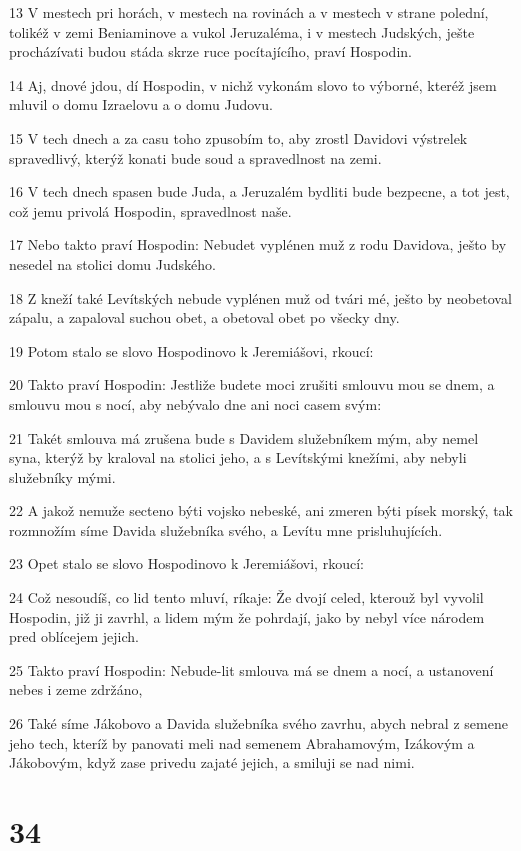 \par 13 V mestech pri horách, v mestech na rovinách a v mestech v strane polední, tolikéž v zemi Beniaminove a vukol Jeruzaléma, i v mestech Judských, ješte procházívati budou stáda skrze ruce pocítajícího, praví Hospodin.
\par 14 Aj, dnové jdou, dí Hospodin, v nichž vykonám slovo to výborné, kteréž jsem mluvil o domu Izraelovu a o domu Judovu.
\par 15 V tech dnech a za casu toho zpusobím to, aby zrostl Davidovi výstrelek spravedlivý, kterýž konati bude soud a spravedlnost na zemi.
\par 16 V tech dnech spasen bude Juda, a Jeruzalém bydliti bude bezpecne, a tot jest, což jemu privolá Hospodin, spravedlnost naše.
\par 17 Nebo takto praví Hospodin: Nebudet vyplénen muž z rodu Davidova, ješto by nesedel na stolici domu Judského.
\par 18 Z kneží také Levítských nebude vyplénen muž od tvári mé, ješto by neobetoval zápalu, a zapaloval suchou obet, a obetoval obet po všecky dny.
\par 19 Potom stalo se slovo Hospodinovo k Jeremiášovi, rkoucí:
\par 20 Takto praví Hospodin: Jestliže budete moci zrušiti smlouvu mou se dnem, a smlouvu mou s nocí, aby nebývalo dne ani noci casem svým:
\par 21 Takét smlouva má zrušena bude s Davidem služebníkem mým, aby nemel syna, kterýž by kraloval na stolici jeho, a s Levítskými knežími, aby nebyli služebníky mými.
\par 22 A jakož nemuže secteno býti vojsko nebeské, ani zmeren býti písek morský, tak rozmnožím síme Davida služebníka svého, a Levítu mne prisluhujících.
\par 23 Opet stalo se slovo Hospodinovo k Jeremiášovi, rkoucí:
\par 24 Což nesoudíš, co lid tento mluví, ríkaje: Že dvojí celed, kterouž byl vyvolil Hospodin, již ji zavrhl, a lidem mým že pohrdají, jako by nebyl více národem pred oblícejem jejich.
\par 25 Takto praví Hospodin: Nebude-lit smlouva má se dnem a nocí, a ustanovení nebes i zeme zdržáno,
\par 26 Také síme Jákobovo a Davida služebníka svého zavrhu, abych nebral z semene jeho tech, kteríž by panovati meli nad semenem Abrahamovým, Izákovým a Jákobovým, když zase privedu zajaté jejich, a smiluji se nad nimi.

\chapter{34}

